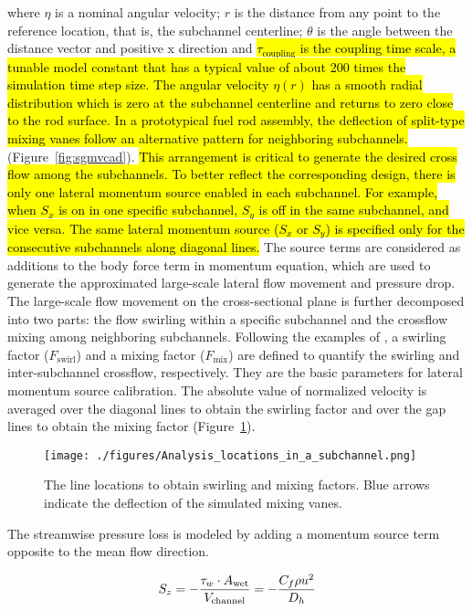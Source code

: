where $\eta$ is a nominal angular velocity;
$r$ is the distance from any point to the reference location, that is, the subchannel centerline;
$\theta$ is the angle between the distance vector and positive x direction and
\hl{$\tau_\text{coupling}$ is the coupling time scale, a tunable model constant that has a typical value of about 200 times the simulation time step size.
The angular velocity $\eta(r)$ has a smooth radial distribution which is zero at the subchannel centerline and returns to zero close to the rod surface.
In a prototypical fuel rod assembly, the deflection of split-type mixing vanes follow an alternative pattern for neighboring subchannels.} (Figure~\ref{fig:sgmvcad}). 
\hl{This arrangement is critical to generate the desired cross flow among the subchannels.
To better reflect the corresponding design, there is only one lateral momentum source enabled in each subchannel. For example, when $S_x$ is on in one specific subchannel, $S_y$ is off in the same subchannel, and vice versa. The same lateral momentum source ($S_x$ or $S_y$) is specified only for the consecutive subchannels along diagonal lines.} 
The source terms are considered as additions to the body force term in momentum equation, which are used to generate the approximated large-scale lateral flow movement and pressure drop.
The large-scale flow movement on the cross-sectional plane is further decomposed into two parts: the flow swirling within a specific subchannel and the crossflow mixing among neighboring subchannels.
Following the examples of \cite{Chang2014},
a swirling factor ($F_\text{swirl}$) and a mixing factor ($F_\text{mix}$) are defined to quantify the swirling and inter-subchannel crossflow, respectively. They are the basic parameters for lateral momentum source calibration. 
The absolute value of normalized velocity is averaged over the diagonal lines to obtain the swirling factor and over the gap lines to obtain the mixing factor (Figure~\ref{fig:sblines}).


\begin{figure}[!ht]
\centering
\texttt{[image: ./figures/Analysis\_locations\_in\_a\_subchannel.png]}
\caption{The line locations to obtain swirling and mixing factors. Blue arrows indicate the deflection of the simulated mixing vanes. }
\label{fig:sblines}
\end{figure}

The streamwise pressure loss is modeled by adding a momentum source term opposite to the mean flow direction.

\begin{equation}
  S_z = -\frac{\tau_w \cdot A_\text{wet}}{V_\text{channel}}=-\frac{C_f \rho u^2}{D_h}\\
\end{equation}

